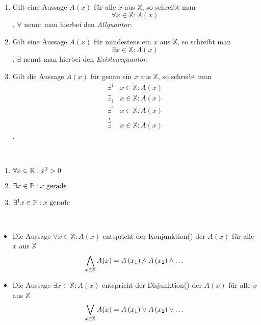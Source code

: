 \begin{definition}~
\begin{enumerate}
\item Gilt eine Aussage $A(x)$ für alle $x$ aus $\mathbb{X}$, so schreibt man \[\forall x \in \mathbb{X} : A(x)\] . $\forall$ nennt man hierbei den \emph{Allquantor}.
\item Gilt eine Aussage $A(x)$ für mindestens ein $x$ aus $\mathbb{X}$, so schreibt man \[\exists x \in \mathbb{X} : A(x)\] . $\exists$ nennt man hierbei den \emph{Existenzquantor}.
\item Gilt die Aussage $A(x)$ für genau ein $x$ aus $\mathbb{X}$, so schreibt man
	\begin{align*}
	\exists^1 &x \in \mathbb{X} : A(x)\\
	\exists_1 &x \in \mathbb{X} : A(x)\\
	\exists^! &x \in \mathbb{X} : A(x)\\
	\stackrel{!}{\exists} &x \in \mathbb{X} : A(x)
	\end{align*}
	.
\end{enumerate}
\end{definition}

\begin{example}~
\begin{enumerate}
\item $\forall x \in \mathbb{R} : x^2 > 0$
\item $\exists x \in \mathbb{P} : x \text{ gerade}$
\item $\exists^1 x \in \mathbb{P} : x \text{ gerade}$
\end{enumerate}
\end{example}

\begin{note}~
\begin{itemize}
\item Die Aussage $\forall x \in \mathbb{X} : A(x)$ entspricht der Konjunktion() der $A(x)$ für alle $x$ aus $\mathbb{X}$ \[\bigwedge_{x \in \mathbb{X}} A(x) = A\left(x_1\right) \wedge A\left(x_2\right) \wedge \dots\]
\item Die Aussage $\exists x \in \mathbb{X} : A(x)$ entspricht der Disjunktion() der $A(x)$ für alle $x$ aus $\mathbb{X}$ \[\bigvee_{x \in \mathbb{X}} A(x) = A\left(x_1\right) \vee A\left(x_2\right) \vee \dots\]
\end{itemize}
\end{note}

